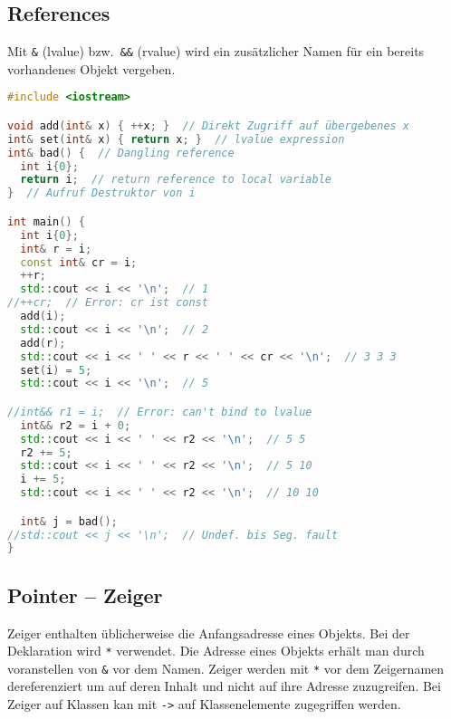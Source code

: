 \subsection{References}

Mit \lstinline|&| (lvalue) bzw.\ \lstinline|&&| (rvalue) wird ein zusätzlicher
Namen für ein bereits vorhandenes Objekt vergeben.

\begin{lstlisting}[language=C++]
#include <iostream>

void add(int& x) { ++x; }  // Direkt Zugriff auf übergebenes x
int& set(int& x) { return x; }  // lvalue expression
int& bad() {  // Dangling reference
  int i{0};
  return i;  // return reference to local variable
}  // Aufruf Destruktor von i

int main() {
  int i{0};
  int& r = i;
  const int& cr = i;
  ++r;
  std::cout << i << '\n';  // 1
//++cr;  // Error: cr ist const
  add(i);
  std::cout << i << '\n';  // 2
  add(r);
  std::cout << i << ' ' << r << ' ' << cr << '\n';  // 3 3 3
  set(i) = 5;
  std::cout << i << '\n';  // 5

//int&& r1 = i;  // Error: can't bind to lvalue
  int&& r2 = i + 0;
  std::cout << i << ' ' << r2 << '\n';  // 5 5
  r2 += 5;
  std::cout << i << ' ' << r2 << '\n';  // 5 10
  i += 5;
  std::cout << i << ' ' << r2 << '\n';  // 10 10

  int& j = bad();
//std::cout << j << '\n';  // Undef. bis Seg. fault
}
\end{lstlisting}

\subsection{Pointer -- Zeiger}

Zeiger enthalten üblicherweise die Anfangsadresse eines Objekts. Bei der
Deklaration wird \lstinline|*| verwendet. Die Adresse eines Objekts erhält man
durch voranstellen von \lstinline|&| vor dem Namen. Zeiger werden mit
\lstinline|*| vor dem Zeigernamen dereferenziert um auf deren Inhalt und nicht
auf ihre Adresse zuzugreifen. Bei Zeiger auf Klassen kan mit \lstinline|->| auf
Klassenelemente zugegriffen werden.

